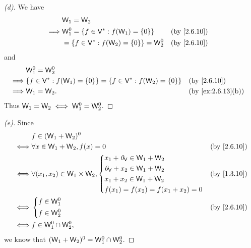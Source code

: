 \begin{proof}[(d)]
  We have
  \begin{align*}
             & \W_1 = \W_2                                                      \\
    \implies & \W_1^0 = \set{f \in \V^* : f(\W_1) = \set{0}}   &  & \by{2.6.10} \\
             & = \set{f \in \V^* : f(\W_2) = \set{0}} = \W_2^0 &  & \by{2.6.10} \\
  \end{align*}
  and
  \begin{align*}
             & \W_1^0 = \W_2^0                                                                                    \\
    \implies & \set{f \in \V^* : f(\W_1) = \set{0}} = \set{f \in \V^* : f(\W_2) = \set{0}} &  & \by{2.6.10}       \\
    \implies & \W_1 = \W_2.                                                                &  & \by{ex:2.6.13}[b]
  \end{align*}
  Thus \(\mathsf{W}_1 = \mathsf{W}_2 \iff \mathsf{W}_1^0 = \mathsf{W}_2^0\).
\end{proof}

\begin{proof}[(e)]
  Since
  \begin{align*}
         & f \in (\W_1 + \W_2)^0                                                      \\
    \iff & \forall x \in \W_1 + \W_2, f(x) = 0                     &  & \by{2.6.10}   \\
    \iff & \forall (x_1, x_2) \in \W_1 \times \W_2, \begin{dcases}
                                                      x_1 + \zv_{\V} \in \W_1 + \W_2 \\
                                                      \zv_{\V} + x_2 \in \W_1 + \W_2 \\
                                                      x_1 + x_2 \in \W_1 + \W_2      \\
                                                      f(x_1) = f(x_2) = f(x_1 + x_2) = 0
                                                    \end{dcases} &  & \by{1.3.10} \\
    \iff & \begin{dcases}
             f \in \W_1^0 \\
             f \in \W_2^0
           \end{dcases}                                         &  & \by{2.6.10}      \\
    \iff & f \in \W_1^0 \cap \W_2^0,
  \end{align*}
  we know that \((\mathsf{W}_1 + \mathsf{W}_2)^0 = \mathsf{W}_1^0 \cap \mathsf{W}_2^0\).
\end{proof}

